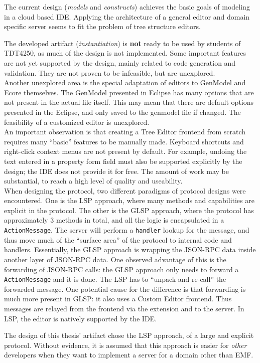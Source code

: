 
The current design (\textit{models} and \textit{constructs}) achieves the basic goals of modeling in a \gls{cloud} based \acrshort{IDE}.
Applying the architecture of a general editor and domain specific server seems to fit the problem of tree structure editors.

The developed artifact (\textit{instantiation}) is \textbf{not} ready to be used by students of \gls{TDT4250}, as much of the design is not implemented.
Some important features are not yet supported by the design, mainly related to code generation and validation.
They are not proven to be infeasible, but are unexplored. \\

Another unexplored area is the special adaptation of editors to GenModel and Ecore themselves.
The GenModel presented in \gls{Eclipse} has many options that are not present in the actual file itself.
This may mean that there are default options presented in the \gls{Eclipse}, and only saved to the genmodel file if changed.
The feasibility of a customized editor is unexplored. \\

An important observation is that creating a Tree Editor frontend from scratch requires many ``basic'' features to be manually made.
Keyboard shortcuts and right-click context menus are not present by default.
For example, undoing the text entered in a property form field must also be supported explicitly by the design; the \acrshort{IDE} does not provide it for free.
The amount of work may be substantial, to reach a high level of quality and useability.\\

When designing the protocol, two different paradigms of protocol designs were encountered.
One is the \acrshort{LSP} approach, where many methods and capabilities are explicit in the protocol.
The other is the \acrshort{GLSP} approach, where the protocol has approximately 3 methods in total, and all the logic is encapsulated in a \texttt{ActionMessage}.
The server will perform a \texttt{handler} lookup for the message, and thus move much of the ``surface area'' of the protocol to internal code and handlers.
Essentially, the \acrshort{GLSP} approach is wrapping the \gls{JSON-RPC} data inside another layer of \gls{JSON-RPC} data.
One observed advantage of this is the forwarding of \gls{JSON-RPC} calls: the \acrshort{GLSP} approach only needs to forward a \texttt{ActionMessage} and it is done.
The \acrshort{LSP} has to ``unpack and re-call'' the forwarded message.
One potential cause for the difference is that forwarding is much more present in \acrshort{GLSP}: it also uses a Custom Editor frontend.
Thus messages are relayed from the frontend via the extension and to the server.
In \acrshort{LSP}, the editor is natively supported by the \acrshort{IDE}.

The design of this thesis' artifact chose the \acrshort{LSP} approach, of a large and explicit protocol.
Without evidence, it is assumed that this approach is easier for \textit{other} developers when they want to implement a server for a domain other than \acrshort{EMF}.